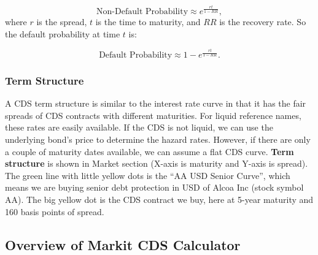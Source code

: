 \documentclass{jss}
\begin{document}
\begin{equation}
  \text{Non-Default Probability} \approx e ^ {\frac{rt}{1-RR}}, 
\end{equation}
where $r$ is the spread, $t$ is the time to maturity, and $RR$ is the recovery rate. So the default probability at time $t$ is:

\begin{equation}
  \text{Default Probability} \approx 1 - e ^ {\frac{rt}{1-RR}}. \nonumber
\end{equation}



\subsubsection{Term Structure}

A CDS term structure is similar to the interest rate curve in that it has the fair spreads of CDS contracts with different maturities. For liquid reference names, these rates are easily available. If the CDS is not liquid, we can use the underlying bond's price to determine the hazard rates. However, if there are only a couple of maturity dates available, we can assume a flat CDS curve. \textbf{Term structure} is shown in Market section (X-axis is maturity and Y-axis is spread). The green line with little yellow dots is the ``AA USD Senior Curve'', which means we are buying senior debt protection in USD of Alcoa Inc (stock symbol AA). The big yellow dot is the CDS contract we buy, here at 5-year maturity and 160 basis points of spread.

\newpage

\subsection{Overview of Markit CDS Calculator}
\label{Markit}

\end{document}
